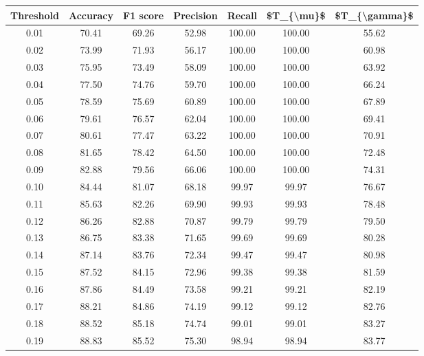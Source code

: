 \begin{tabular}{|c|c|c|c|c|c|c|}
\hline
 Threshold &  Accuracy &  F1 score &  Precision &  Recall &  \$T\_\{\textbackslash mu\}\$ &  \$T\_\{\textbackslash gamma\}\$ \\
\hline
      0.01 &     70.41 &     69.26 &      52.98 &  100.00 &     100.00 &         55.62 \\
      0.02 &     73.99 &     71.93 &      56.17 &  100.00 &     100.00 &         60.98 \\
      0.03 &     75.95 &     73.49 &      58.09 &  100.00 &     100.00 &         63.92 \\
      0.04 &     77.50 &     74.76 &      59.70 &  100.00 &     100.00 &         66.24 \\
      0.05 &     78.59 &     75.69 &      60.89 &  100.00 &     100.00 &         67.89 \\
      0.06 &     79.61 &     76.57 &      62.04 &  100.00 &     100.00 &         69.41 \\
      0.07 &     80.61 &     77.47 &      63.22 &  100.00 &     100.00 &         70.91 \\
      0.08 &     81.65 &     78.42 &      64.50 &  100.00 &     100.00 &         72.48 \\
      0.09 &     82.88 &     79.56 &      66.06 &  100.00 &     100.00 &         74.31 \\
      0.10 &     84.44 &     81.07 &      68.18 &   99.97 &      99.97 &         76.67 \\
      0.11 &     85.63 &     82.26 &      69.90 &   99.93 &      99.93 &         78.48 \\
      0.12 &     86.26 &     82.88 &      70.87 &   99.79 &      99.79 &         79.50 \\
      0.13 &     86.75 &     83.38 &      71.65 &   99.69 &      99.69 &         80.28 \\
      0.14 &     87.14 &     83.76 &      72.34 &   99.47 &      99.47 &         80.98 \\
      0.15 &     87.52 &     84.15 &      72.96 &   99.38 &      99.38 &         81.59 \\
      0.16 &     87.86 &     84.49 &      73.58 &   99.21 &      99.21 &         82.19 \\
      0.17 &     88.21 &     84.86 &      74.19 &   99.12 &      99.12 &         82.76 \\
      0.18 &     88.52 &     85.18 &      74.74 &   99.01 &      99.01 &         83.27 \\
      0.19 &     88.83 &     85.52 &      75.30 &   98.94 &      98.94 &         83.77 \\

\end{tabular}
